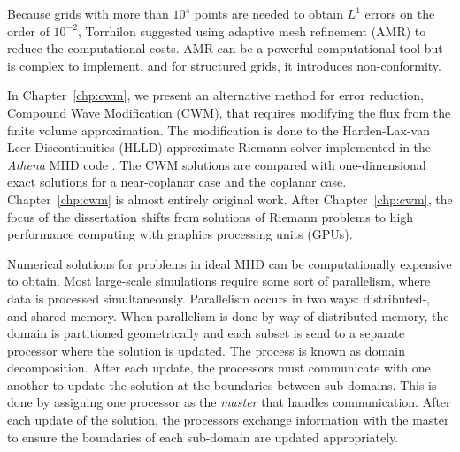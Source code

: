 Because grids with more than $10^4$ points are needed to obtain $L^1$ errors on the order of $10^{-2}$, Torrhilon \citep{Torrilhon:2003b} suggested using adaptive mesh refinement (AMR) to reduce the computational costs.  AMR can be a powerful computational tool but is complex to implement, and for structured grids, it introduces non-conformity.  

In Chapter~\ref{chp:cwm}, we present an alternative method for error reduction, Compound Wave Modification (CWM), that requires modifying the flux from the finite volume approximation.  The modification is done to the Harden-Lax-van Leer-Discontinuities (HLLD) \citep{Miyoshi:2005} approximate Riemann solver implemented in the \emph{Athena} MHD code \citep{Stone:2008,AthenaSite}.  The CWM solutions are compared with one-dimensional exact solutions for a near-coplanar case and the coplanar case.  Chapter~\ref{chp:cwm} is almost entirely original work.  After Chapter~\ref{chp:cwm}, the focus of the dissertation shifts from solutions of Riemann problems to high performance computing with graphics processing units (GPUs).

Numerical solutions for problems in ideal MHD can be computationally expensive to obtain.  Most large-scale simulations require some sort of parallelism, where data is processed simultaneously.  Parallelism occurs in two ways: distributed-, and shared-memory.  When parallelism is done by way of distributed-memory, the domain is partitioned geometrically and each subset is send to a separate processor where the solution is updated.  The process is known as domain decomposition.   After each update, the processors must communicate with one another to update the solution at the boundaries between sub-domains.  This is done by assigning one processor as the \emph{master} that handles communication.  After each update of the solution, the processors exchange information with the master to ensure the boundaries of each sub-domain are updated appropriately.

